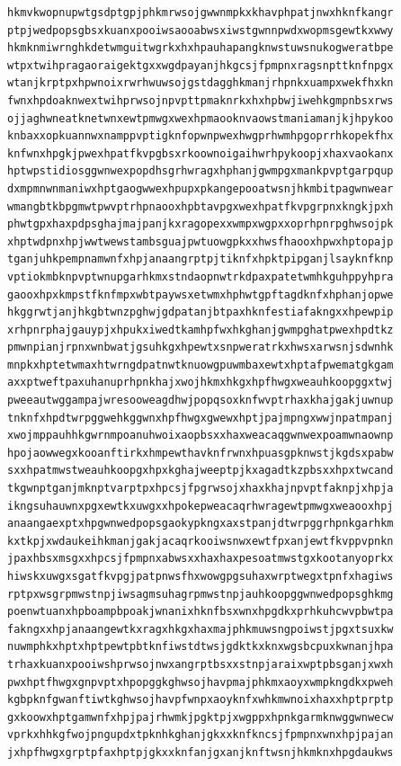 \documentclass[11pt,letterpaper]{exam}
\begin{document}
\begin{questions}
\begin{verbatim}
hkmvkwopnupwtgsdptgpjphkmrwsojgwwnmpkxkhavphpatjnwxhknfkangr
ptpjwedpopsgbsxkuanxpooiwsaooabwsxiwstgwnnpwdxwopmsgewtkxwwy
hkmknmiwrnghkdetwmguitwgrkxhxhpauhapangknwstuwsnukogweratbpe
wtpxtwihpragaoraigektgxxwgdpayanjhkgcsjfpmpnxragsnpttknfnpgx
wtanjkrptpxhpwnoixrwrhwuwsojgstdagghkmanjrhpnkxuampxwekfhxkn
fwnxhpdoaknwextwihprwsojnpvpttpmaknrkxhxhpbwjiwehkgmpnbsxrws
ojjaghwneatknetwnxewtpmwgxwexhpmaooknvaowstmaniamanjkjhpykoo
knbaxxopkuannwxnamppvptigknfopwnpwexhwgprhwmhpgoprrhkopekfhx
knfwnxhpgkjpwexhpatfkvpgbsxrkoownoigaihwrhpykoopjxhaxvaokanx
hptwpstidiosggwnwexpopdhsgrhwragxhphanjgwmpgxmankpvptgarpqup
dxmpmnwnmaniwxhptgaogwwexhpupxpkangepooatwsnjhkmbitpagwnwear
wmangbtkbpgmwtpwvptrhpnaooxhpbtavpgxwexhpatfkvpgrpnxkngkjpxh
phwtgpxhaxpdpsghajmajpanjkxragopexxwmpxwgpxxoprhpnrpghwsojpk
xhptwdpnxhpjwwtwewstambsguajpwtuowgpkxxhwsfhaooxhpwxhptopajp
tganjuhkpempnamwnfxhpjanaangrptpjtiknfxhpktpipganjlsayknfknp
vptiokmbknpvptwnupgarhkmxstndaopnwtrkdpaxpatetwmhkguhppyhpra
gaooxhpxkmpstfknfmpxwbtpaywsxetwmxhphwtgpftagdknfxhphanjopwe
hkggrwtjanjhkgbtwnzpghwjgdpatanjbtpaxhknfestiafakngxxhpewpip
xrhpnrphajgauypjxhpukxiwedtkamhpfwxhkghanjgwmpghatpwexhpdtkz
pmwnpianjrpnxwnbwatjgsuhkgxhpewtxsnpweratrkxhwsxarwsnjsdwnhk
mnpkxhptetwmaxhtwrngdpatnwtknuowgpuwmbaxewtxhptafpwematgkgam
axxptweftpaxuhanuprhpnkhajxwojhkmxhkgxhpfhwgxweauhkoopggxtwj
pweeautwggampajwresooweagdhwjpopqsoxknfwvptrhaxkhajgakjuwnup
tnknfxhpdtwrpggwehkggwnxhpfhwgxgwewxhptjpajmpngxwwjnpatmpanj
xwojmppauhhkgwrnmpoanuhwoixaopbsxxhaxweacaqgwnwexpoamwnaownp
hpojaowwegxkooanftirkxhmpewthavknfrwnxhpuasgpknwstjkgdsxpabw
sxxhpatmwstweauhkoopgxhpxkghajweeptpjkxagadtkzpbsxxhpxtwcand
tkgwnptganjmknptvarptpxhpcsjfpgrwsojxhaxkhajnpvptfaknpjxhpja
ikngsuhauwnxpgxewtkxuwgxxhpokepweacaqrhwragewtpmwgxweaooxhpj
anaangaexptxhpgwnwedpopsgaokypkngxaxstpanjdtwrpggrhpnkgarhkm
kxtkpjxwdaukeihkmanjgakjacaqrkooiwsnwxewtfpxanjewtfkvppvpnkn
jpaxhbsxmsgxxhpcsjfpmpnxabwsxxhaxhaxpesoatmwstgxkootanyoprkx
hiwskxuwgxsgatfkvpgjpatpnwsfhxwowgpgsuhaxwrptwegxtpnfxhagiws
rptpxwsgrpmwstnpjiwsagmsuhagrpmwstnpjauhkoopggwnwedpopsghkmg
poenwtuanxhpboampbpoakjwnanixhknfbsxwnxhpgdkxprhkuhcwvpbwtpa
fakngxxhpjanaangewtkxragxhkgxhaxmajphkmuwsngpoiwstjpgxtsuxkw
nuwmphkxhptxhptpewtpbtknfiwstdtwsjgdktkxknxwgsbcpuxkwnanjhpa
trhaxkuanxpooiwshprwsojnwxangrptbsxxstnpjaraixwptpbsganjxwxh
pwxhptfhwgxgnpvptxhpopggkghwsojhavpmajphkmxaoyxwmpkngdkxpweh
kgbpknfgwanftiwtkghwsojhavpfwnpxaoyknfxwhkmwnoixhaxxhptprptp
gxkoowxhptgamwnfxhpjpajrhwmkjpgktpjxwgppxhpnkgarmknwggwnwecw
vprkxhhkgfwojpngupdxtpknhkghanjgkxxknfkncsjfpmpnxwnxhpjpajan
jxhpfhwgxgrptpfaxhptpjgkxxknfanjgxanjknftwsnjhkmknxhpgdaukws

\end{verbatim}
\end{questions}
\end{document}
